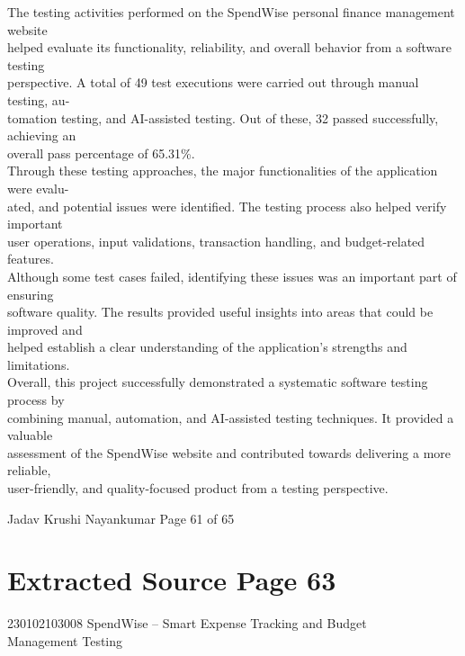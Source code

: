\documentclass[12pt,a4paper]{report}
\begin{document}
\smallskip
The testing activities performed on the SpendWise personal finance management website\\ 
helped evaluate its functionality, reliability, and overall behavior from a software testing\\ 
perspective. A total of 49 test executions were carried out through manual testing, au-\\ 
tomation testing, and AI-assisted testing. Out of these, 32 passed successfully, achieving an\\ 
overall pass percentage of 65.31\%.\\ 
Through these testing approaches, the major functionalities of the application were evalu-\\ 
ated, and potential issues were identified. The testing process also helped verify important\\ 
user operations, input validations, transaction handling, and budget-related features.\\ 
Although some test cases failed, identifying these issues was an important part of ensuring\\ 
software quality. The results provided useful insights into areas that could be improved and\\ 
helped establish a clear understanding of the application’s strengths and limitations.\\ 
Overall, this project successfully demonstrated a systematic software testing process by\\ 
combining manual, automation, and AI-assisted testing techniques. It provided a valuable\\ 
assessment of the SpendWise website and contributed towards delivering a more reliable,\\ 
user-friendly, and quality-focused product from a testing perspective.\\ 

\smallskip

\smallskip

\smallskip

\smallskip
Jadav Krushi Nayankumar                                                      Page 61 of 65\\ 

\clearpage
\section*{Extracted Source Page 63}
230102103008                           SpendWise – Smart Expense Tracking and Budget\\ 
Management Testing\\ 
\end{document}

